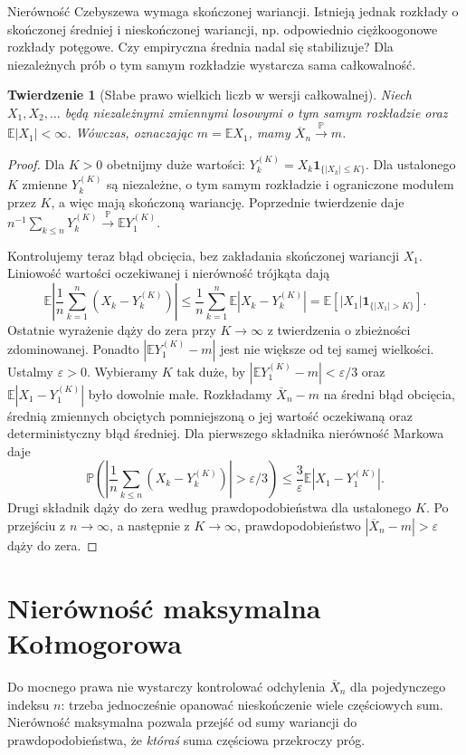 \documentclass[11pt,a4paper,oneside]{report}
\numberwithin{equation}{chapter}
\theoremstyle{plain}
\newtheorem{twierdzenie}{Twierdzenie}[chapter]
\theoremstyle{definition}
\theoremstyle{remark}
\newcommand{\Prob}{\mathbb{P}}
\newcommand{\E}{\mathbb{E}}
\newcommand{\ind}[1]{\mathbf{1}_{#1}}
\begin{document}
Nierówność Czebyszewa wymaga skończonej wariancji.
Istnieją jednak rozkłady o skończonej średniej i
nieskończonej wariancji, np. odpowiednio ciężkoogonowe
rozkłady potęgowe. Czy empiryczna średnia nadal się
stabilizuje? Dla niezależnych prób o tym samym rozkładzie
wystarcza sama całkowalność.

\begin{twierdzenie}[Słabe prawo wielkich liczb w wersji całkowalnej]
Niech $X_1,X_2,\ldots$ będą niezależnymi zmiennymi
losowymi o tym samym rozkładzie oraz
$\E|X_1|<\infty$. Wówczas, oznaczając $m=\E X_1$,
mamy $\overline X_n\xrightarrow{\Prob}m$.
\end{twierdzenie}
\begin{proof}
Dla $K>0$ obetnijmy duże wartości:
$Y_k^{(K)}=X_k\ind{\{|X_k|\leq K\}}$.
Dla ustalonego $K$ zmienne $Y_k^{(K)}$ są niezależne,
o tym samym rozkładzie i ograniczone modułem przez $K$,
a więc mają skończoną wariancję. Poprzednie twierdzenie
daje $n^{-1}\sum_{k\leq n}Y_k^{(K)}
\xrightarrow{\Prob}\E Y_1^{(K)}$.

Kontrolujemy teraz błąd obcięcia, bez zakładania
skończonej wariancji $X_1$. Liniowość wartości
oczekiwanej i nierówność trójkąta dają
\[
\E\left|\frac1n\sum_{k=1}^n(X_k-Y_k^{(K)})\right|
\leq\frac1n\sum_{k=1}^n\E|X_k-Y_k^{(K)}|
=\E[|X_1|\ind{\{|X_1|>K\}}].
\]
Ostatnie wyrażenie dąży do zera przy $K\to\infty$
z twierdzenia o zbieżności zdominowanej.
Ponadto $|\E Y_1^{(K)}-m|$ jest nie większe od tej
samej wielkości. Ustalmy $\varepsilon>0$. Wybieramy
$K$ tak duże, by $|\E Y_1^{(K)}-m|<\varepsilon/3$
oraz $\E|X_1-Y_1^{(K)}|$ było dowolnie małe.
Rozkładamy $\overline X_n-m$ na średni błąd obcięcia,
średnią zmiennych obciętych pomniejszoną o jej wartość
oczekiwaną oraz deterministyczny błąd średniej.
Dla pierwszego składnika nierówność Markowa daje
\[
\Prob\!\left(\left|\frac1n\sum_{k\leq n}
(X_k-Y_k^{(K)})\right|>\varepsilon/3\right)
\leq\frac3\varepsilon\E|X_1-Y_1^{(K)}|.
\]
Drugi składnik dąży do zera według prawdopodobieństwa
dla ustalonego $K$. Po przejściu z $n\to\infty$,
a następnie z $K\to\infty$, prawdopodobieństwo
$|\overline X_n-m|>\varepsilon$ dąży do zera.
\end{proof}

\section{Nierówność maksymalna Kołmogorowa}

Do mocnego prawa nie wystarczy kontrolować odchylenia
$\overline X_n$ dla pojedynczego indeksu $n$: trzeba
jednocześnie opanować nieskończenie wiele częściowych sum.
Nierówność maksymalna pozwala przejść od sumy wariancji
do prawdopodobieństwa, że \emph{któraś} suma częściowa
przekroczy próg.
\end{document}
